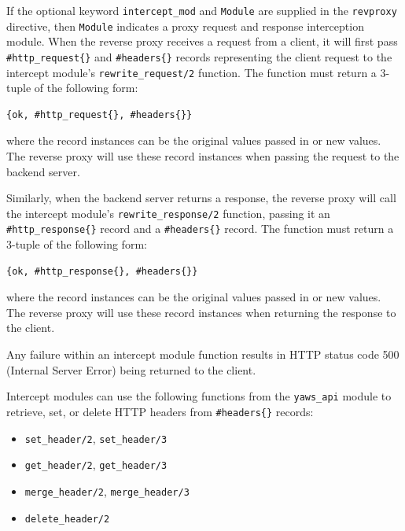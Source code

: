 \documentclass[11pt,oneside,english]{book}
\begin{document}
\begin{itemize}
              If the optional keyword \verb+intercept_mod+ and
              \verb+Module+ are supplied in the \verb+revproxy+ directive,
              then \verb+Module+ indicates a proxy request and response
              interception module. When the reverse proxy receives a
              request from a client, it will first pass
              \verb+#http_request{}+ and \verb+#headers{}+ records
              representing the client request to the intercept module's
              \verb+rewrite_request/2+ function. The function must return a
              3-tuple of the following form:

\begin{verbatim}
{ok, #http_request{}, #headers{}}
\end{verbatim}

              where the record instances can be the original values passed
              in or new values. The reverse proxy will use these record
              instances when passing the request to the backend server.

              Similarly, when the backend server returns a response, the
              reverse proxy will call the intercept module's
              \verb+rewrite_response/2+ function, passing it an
              \verb+#http_response{}+ record and a \verb+#headers{}+
              record. The function must return a 3-tuple of the following
              form:

\begin{verbatim}
{ok, #http_response{}, #headers{}}
\end{verbatim}

              where the record instances can be the original values passed
              in or new values. The reverse proxy will use these record
              instances when returning the response to the client.

              Any failure within an intercept module function results in
              HTTP status code 500 (Internal Server Error) being returned
              to the client.

              Intercept modules can use the following functions from the
              \verb+yaws_api+ module to retrieve, set, or delete HTTP
              headers from \verb+#headers{}+ records:

\begin{itemize}
\item \verb+set_header/2+, \verb+set_header/3+
\item \verb+get_header/2+, \verb+get_header/3+
\item \verb+merge_header/2+, \verb+merge_header/3+
\item \verb+delete_header/2+
\end{itemize}


\end{itemize}
\end{document}
